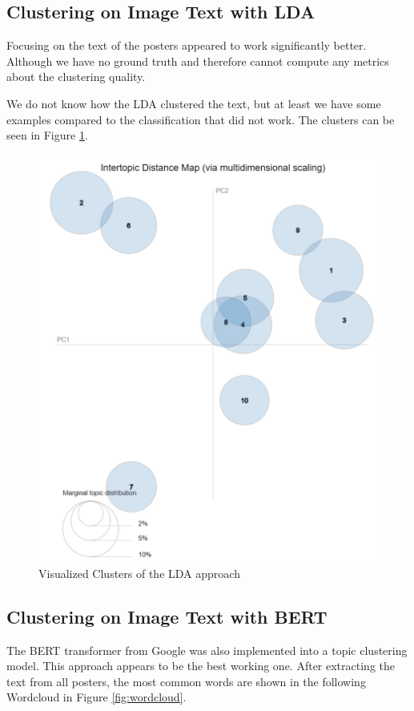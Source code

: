 \documentclass[conference]{IEEEtran}
\begin{document}
\subsection{Clustering on Image Text with LDA}
Focusing on the text of the posters appeared to work significantly better. Although we have no ground truth and therefore cannot compute any metrics about the clustering quality.

We do not know how the LDA clustered the text, but at least we have some examples compared to the classification that did not work. The clusters can be seen in Figure \ref{fig:lda_example}.

\begin{figure}
\centering
\includegraphics[width=1\linewidth]{../Imgs/lda_map}
\caption{Visualized Clusters of the LDA approach}
\label{fig:lda_example}
\end{figure}

\subsection{Clustering on Image Text with BERT}
The BERT transformer from Google was also implemented into a topic clustering model. This approach appears to be the best working one. After extracting the text from all posters, the most common words are shown in the following Wordcloud in Figure \ref{fig:wordcloud}.
\end{document}
